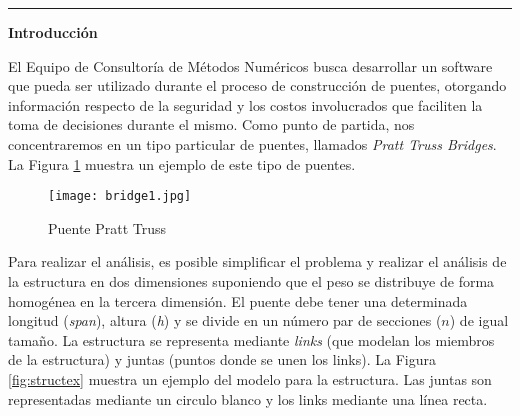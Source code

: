 
\vskip 25pt
\hrule
\vskip 11pt
 
\textbf{Introducci\'on}

El Equipo de Consultor\'ia de M\'etodos Num\'ericos busca desarrollar un software que pueda ser utilizado durante el
proceso de construcci\'on de puentes, otorgando informaci\'on respecto de la seguridad y los costos involucrados que
faciliten la toma de decisiones durante el mismo. Como punto de partida, nos concentraremos en un tipo particular de
puentes, llamados \emph{Pratt Truss Bridges}. La Figura \ref{fig:bridgeex} muestra un ejemplo de este tipo de puentes.

\begin{figure}[!ht]
\begin{center}
\texttt{[image: bridge1.jpg]}
\caption{Puente Pratt Truss}
\label{fig:bridgeex}
\end{center}
\end{figure}

Para realizar el an\'alisis, es posible simplificar el problema y realizar el an\'alisis de la estructura en dos
dimensiones suponiendo que el peso se distribuye de forma homog\'enea en la tercera dimensi\'on. El puente debe tener una determinada longitud (\emph{span}), altura (\emph{h}) y se divide en un n\'umero par
de secciones ($n$) de igual tama\~no. La estructura se representa mediante \emph{links} (que modelan los miembros de la estructura) y
juntas (puntos donde se unen los links). La Figura \ref{fig:structex} muestra un ejemplo del modelo para la estructura.
Las juntas son representadas mediante un circulo blanco y los links mediante una l\'inea recta.

